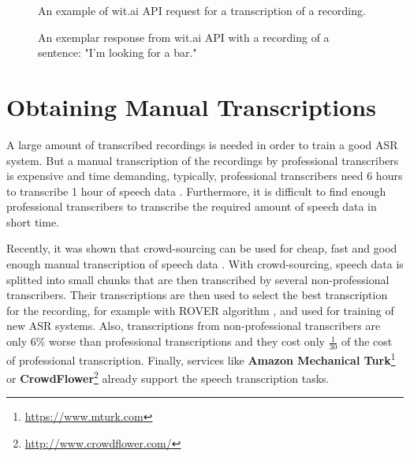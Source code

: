 \begin{figure}[h]
  

  \caption{An example of wit.ai API request for a transcription of a recording.}
  \label{fig:wit-ai-request}
\end{figure}

\begin{figure}[h]
  

  \caption{An exemplar response from wit.ai API with a recording of a sentence: "I'm looking for a bar."}
  \label{fig:wit-ai-response}
\end{figure}


\section{Obtaining Manual Transcriptions}
A large amount of transcribed recordings is needed in order to train a good ASR system.
But a manual transcription of the recordings by professional transcribers is expensive and time demanding,
  typically, professional transcribers need 6 hours to transcribe 1 hour of speech data \cite{williams2011crowd}.
Furthermore, it is difficult to find enough professional transcribers to transcribe the required amount of speech data in short time.

Recently, it was shown that crowd-sourcing can be used for cheap, fast and good enough manual transcription of speech data \cite{novotney2010cheap}.
With crowd-sourcing, speech data is splitted into small chunks that are then transcribed by several non-professional transcribers.
Their transcriptions are then used to select the best transcription for the recording, for example with ROVER algorithm \cite{marge2010using}, and used for training of new ASR systems.
Also, transcriptions from non-professional transcribers are only $6\%$ worse than professional transcriptions
  and they cost only $\frac{1}{30}$ of the cost of professional transcription.
Finally, services like \textbf{Amazon Mechanical Turk}\footnote{\url{https://www.mturk.com}}
  or \textbf{CrowdFlower}\footnote{\url{http://www.crowdflower.com/}} already support the speech transcription tasks.

